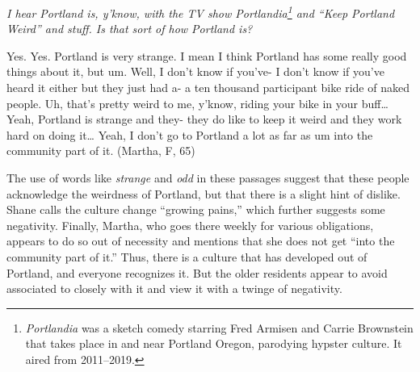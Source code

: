 \begin{num_quote}
    \textit{I hear Portland is, y'know, with the TV show Portlandia\footnote{\textit{Portlandia} was a sketch comedy starring Fred Armisen and Carrie Brownstein that takes place in and near Portland Oregon, parodying hypster culture. It aired from 2011--2019.} and ``Keep Portland Weird'' and stuff. Is that sort of how Portland is?	}

    Yes. Yes. Portland is very strange. I mean I think Portland has some really good things about it, but um. Well, I don't know if you've- I don't know if you've heard it either but they just had a- a ten thousand participant bike ride of naked people. Uh, that's pretty weird to me, y'know, riding your bike in your buff… Yeah, Portland is strange and they- they do like to keep it weird and they work hard on doing it… Yeah, I don't go to Portland a lot as far as um into the community part of it. (Martha, F, 65)\label{quote:portland_is_strange}
\end{num_quote}
The use of words like \textit{strange} and \textit{odd} in these passages suggest that these people acknowledge the weirdness of Portland, but that there is a slight hint of dislike. Shane calls the culture change ``growing pains,'' which further suggests some negativity. Finally, Martha, who goes there weekly for various obligations, appears to do so out of necessity and mentions that she does not get ``into the community part of it.'' Thus, there is a culture that has developed out of Portland, and everyone recognizes it. But the older residents appear to avoid associated to closely with it and view it with a twinge of negativity.

